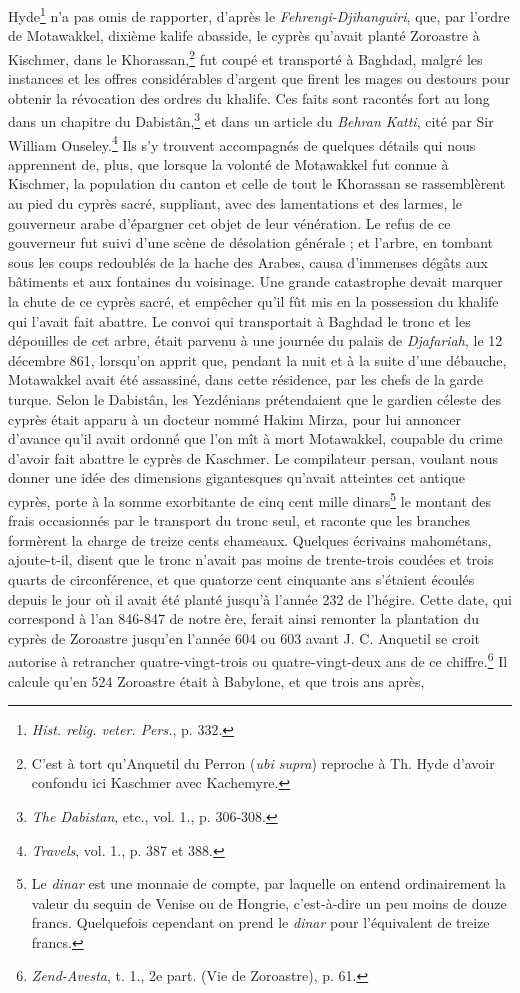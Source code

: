 \documentclass[a4paper, 11pt, oneside, polutonikogreek, french]{article}
\begin{document}
Hyde\footnote{\emph{Hist. relig. veter. Pers.}, p. 332.} n'a pas omis de rapporter, d'après le \emph{Fehrengi-Djihanguiri}, que, par l'ordre de Motawakkel, dixième kalife abasside, le cyprès qu'avait planté Zoroastre à Kischmer, dans le Khorassan,\footnote{C'est à tort qu'Anquetil du Perron (\emph{ubi supra}) reproche à Th. Hyde d'avoir confondu ici Kaschmer avec Kachemyre.} fut coupé et transporté à Baghdad, malgré les instances et les offres considérables d'argent que firent les mages ou destours pour obtenir la révocation des ordres du khalife. Ces faits sont racontés fort au long dans un chapitre du Dabistân,\footnote{\emph{The Dabistan}, etc., vol. 1., p. 306-308.} et dans un article du \emph{Behran Katti}, cité par Sir William Ouseley.\footnote{\emph{Travels}, vol. 1., p. 387 et 388.} Ils s'y trouvent accompagnés de quelques détails qui nous apprennent de, plus, que lorsque la volonté de Motawakkel fut connue à Kischmer, la population du canton et celle de tout le Khorassan se rassemblèrent au pied du cyprès sacré, suppliant, avec des lamentations et des larmes, le gouverneur arabe d'épargner cet objet de leur vénération. Le refus de ce gouverneur fut suivi d'une scène de désolation générale ; et l'arbre, en tombant sous les coups redoublés de la hache des Arabes, causa d'immenses dégâts aux bâtiments et aux fontaines du voisinage. Une grande catastrophe devait marquer la chute de ce cyprès sacré, et empêcher qu'il fût mis en la possession du khalife qui l'avait fait abattre. Le convoi qui transportait à Baghdad le tronc et les dépouilles de cet arbre, était parvenu à une journée du palais de \emph{Djafariah}, le 12 décembre 861, lorsqu'on apprit que, pendant la nuit et à la suite d'une débauche, Motawakkel avait été assassiné, dans cette résidence, par les chefs de la garde turque. Selon le Dabistân, les Yezdénians prétendaient que le gardien céleste des cyprès était apparu à un docteur nommé Hakim Mirza, pour lui annoncer d'avance qu'il avait ordonné que l'on mît à mort Motawakkel, coupable du crime d'avoir fait abattre le cyprès de Kaschmer. Le compilateur persan, voulant nous donner une idée des dimensions gigantesques qu'avait atteintes cet antique cyprès, porte à la somme exorbitante de cinq cent mille dinars\footnote{Le \emph{dinar} est une monnaie de compte, par laquelle on entend ordinairement la valeur du sequin de Venise ou de Hongrie, c'est-à-dire un peu moins de douze francs. Quelquefois cependant on prend le \emph{dinar} pour l'équivalent de treize francs.} le montant des frais occasionnés par le transport du tronc seul, et raconte que les branches formèrent la charge de treize cents chameaux. Quelques écrivains mahométans, ajoute-t-il, disent que le tronc n'avait pas moins de trente-trois coudées et trois quarts de circonférence, et que quatorze cent cinquante ans s'étaient écoulés depuis le jour où il avait été planté jusqu'à l'année 232 de l'hégire. Cette date, qui correspond à l'an 846-847 de notre ère, ferait ainsi remonter la plantation du cyprès de Zoroastre jusqu'en l'année 604 ou 603 avant J. C. Anquetil se croit autorise à retrancher quatre-vingt-trois ou quatre-vingt-deux ans de ce chiffre.\footnote{\emph{Zend-Avesta}, t. 1., 2e part. (Vie de Zoroastre), p. 61.} Il calcule qu'en 524 Zoroastre était à Babylone, et que trois ans après, 
\end{document}
